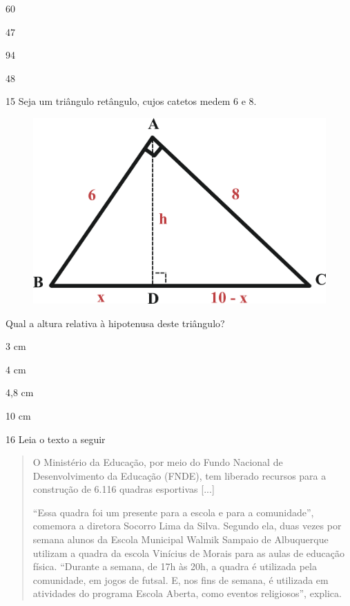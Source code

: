 \begin{escolha}

  \item 60

  \item 47

  \item 94

  \item 48

\end{escolha}

\pagebreak
\num{15} Seja um triângulo retângulo, cujos catetos medem 6 e 8.

\begin{figure}[htpb!]
\centering
\includegraphics[width=.5\textwidth]{./ilustras-mat/Simulado_2-atividade_15_resposta.png}
\end{figure}

Qual a altura relativa à hipotenusa deste triângulo?

\begin{escolha}

  \item 3 cm

  \item 4 cm

  \item 4,8 cm

  \item 10 cm

\end{escolha}


\num{16} Leia o texto a seguir

\begin{quote}
O Ministério da Educação, por meio do Fundo Nacional de Desenvolvimento
da Educação (FNDE), tem liberado recursos para a construção de 6.116
quadras esportivas {[}...{]}

``Essa quadra foi um presente para a escola e para a comunidade'',
comemora a diretora Socorro Lima da Silva. Segundo ela, duas vezes por
semana alunos da Escola Municipal Walmik Sampaio de Albuquerque utilizam
a quadra da escola Vinícius de Morais para as aulas de educação física.
``Durante a semana, de 17h às 20h, a quadra é utilizada pela comunidade,
em jogos de futsal. E, nos fins de semana, é utilizada em atividades do
programa Escola Aberta, como eventos religiosos'', explica.

\end{quote}

